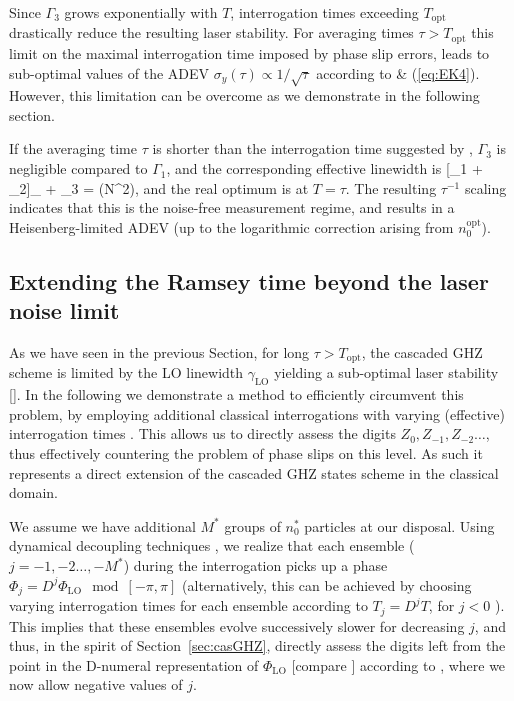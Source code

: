 Since $\Gamma_3$ grows exponentially with $T$, interrogation times exceeding $T_\mathrm{opt}$ drastically reduce the resulting laser stability. For averaging times $\tau>T_\mathrm{opt}$ this limit on the maximal interrogation time imposed by phase slip errors, leads to sub-optimal values of the ADEV $\sigma_y(\tau)\propto 1/\sqrt \tau$ according to  \& (\ref{eq:EK4}).
However, this limitation can be overcome as we demonstrate in the following section.


If the averaging time $\tau$ is shorter than the
interrogation time suggested by , $\Gamma_3$
is negligible compared to $\Gamma_1$, and the corresponding effective
linewidth is 
\bel
\label{eq:EK7}
	[\Gamma_1 + \Gamma_2]_ + \Gamma_3 \approx{} =   \log\left(N^2\right),
\eel
and the real optimum is at
$T = \tau$.
The resulting $\tau^{-1}$ scaling indicates that this is the noise-free measurement
regime, and results in a Heisenberg-limited ADEV (up to the logarithmic correction arising from $n_0^\mathrm{opt}$).


\subsection{Extending the Ramsey time beyond the laser noise limit}
\label{sec:BLNL}

As we have seen in the previous Section, for long $\tau>T_\mathrm{opt}$, the
cascaded GHZ scheme is limited by the LO linewidth $\gamma_\mathrm{LO}$ yielding
a sub-optimal laser stability []. In the following we demonstrate
a method to efficiently circumvent this problem, by employing additional
classical interrogations with varying (effective) interrogation times
\cite{Rosenband2013, Borregaard2013}. This allows us to directly assess the
digits $Z_0, Z_{-1}, Z_{-2} \dots$, thus effectively countering the problem of
phase slips on this level. As such it represents a direct extension of the
cascaded GHZ states scheme in the classical domain.

We assume we have additional $M^*$ groups of $n_0^*$ particles at our disposal.
Using dynamical decoupling techniques \cite{ddc}, we realize that each ensemble
($j=-1,-2\hdots,-M^*$) during the interrogation picks up a phase $\Phi_{j}=
D^{j} \Phi_\mathrm{LO} \mod [-\pi,\pi]$ (alternatively, this can be achieved by
choosing varying interrogation times for each ensemble according to $T_{j} =
D^jT$, for $j<0$ \cite{Rosenband2013}).
This implies that these ensembles evolve successively slower for decreasing $j$,
and thus, in the spirit of Section~\ref{sec:casGHZ}, directly assess the digits
left from the point in the D-numeral representation of $\Phi_\mathrm{LO}$
[compare ] according to , where we
now allow negative values of $j$.

